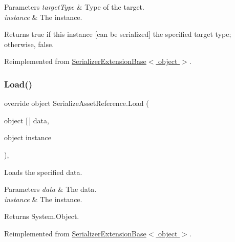 \begin{DoxyParams}{Parameters}
{\em target\+Type} & Type of the target.\\
\hline
{\em instance} & The instance.\\
\hline
\end{DoxyParams}
\begin{DoxyReturn}{Returns}
{\ttfamily true} if this instance \mbox{[}can be serialized\mbox{]} the specified target type; otherwise, {\ttfamily false}.
\end{DoxyReturn}


Reimplemented from \hyperlink{class_serializer_extension_base_a50e69037fda6bdcc080cdc3c51d25b99}{Serializer\+Extension\+Base$<$ object $>$}.

\mbox{\label{class_serialize_asset_reference_ab37514eab05ceebd554e33646c8e058a}} 
\subsubsection{\texorpdfstring{Load()}{Load()}}
{\footnotesize\ttfamily override object Serialize\+Asset\+Reference.\+Load (\begin{DoxyParamCaption}\item[{object \mbox{[}$\,$\mbox{]}}]{data,  }\item[{object}]{instance }\end{DoxyParamCaption})\hspace{0.3cm}{\ttfamily [inline]}, {\ttfamily [virtual]}}



Loads the specified data. 


\begin{DoxyParams}{Parameters}
{\em data} & The data.\\
\hline
{\em instance} & The instance.\\
\hline
\end{DoxyParams}
\begin{DoxyReturn}{Returns}
System.\+Object.
\end{DoxyReturn}


Reimplemented from \hyperlink{class_serializer_extension_base_a3792a9b27056e30ca0ac91531936ae47}{Serializer\+Extension\+Base$<$ object $>$}.

\mbox{\label{class_serialize_asset_reference_af5e17876467e84231b3c7925871b1978}} 
